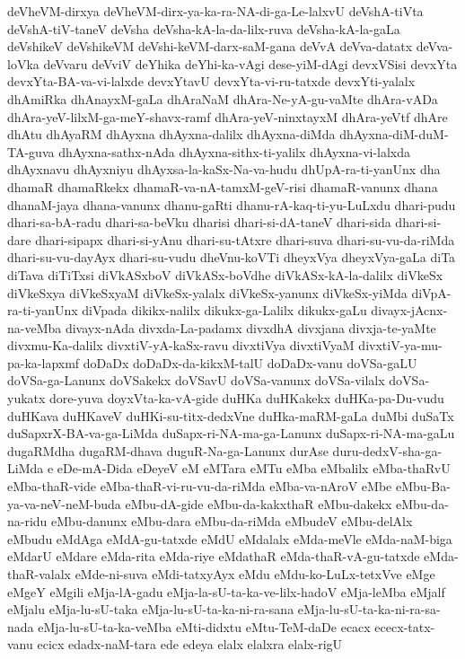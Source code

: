{deVheVM-dirxya
deVheVM-dirx-ya-ka-ra-NA-di-ga-Le-lalxvU
deVshA-tiVta
deVshA-tiV-taneV
deVsha
deVsha-kA-la-da-lilx-ruva
deVsha-kA-la-gaLa
deVshikeV
deVshikeVM
deVshi-keVM-darx-saM-gana
deVvA
deVva-datatx
deVva-loVka
deVvaru
deVviV
deYhika
deYhi-ka-vAgi
dese-yiM-dAgi
devxVSisi
devxYta
devxYta-BA-va-vi-lalxde
devxYtavU
devxYta-vi-ru-tatxde
devxYti-yalalx
dhAmiRka
dhAnayxM-gaLa
dhAraNaM
dhAra-Ne-yA-gu-vaMte
dhAra-vADa
dhAra-yeV-lilxM-ga-meY-shavx-ramf
dhAra-yeV-ninxtayxM
dhAra-yeVtf
dhAre
dhAtu
dhAyaRM
dhAyxna
dhAyxna-dalilx
dhAyxna-diMda
dhAyxna-diM-duM-TA-guva
dhAyxna-sathx-nAda
dhAyxna-sithx-ti-yalilx
dhAyxna-vi-lalxda
dhAyxnavu
dhAyxniyu
dhAyxsa-la-kaSx-Na-va-hudu
dhUpA-ra-ti-yanUnx
dha
dhamaR
dhamaRkekx
dhamaR-va-nA-tamxM-geV-risi
dhamaR-vanunx
dhana
dhanaM-jaya
dhana-vanunx
dhanu-gaRti
dhanu-rA-kaq-ti-yu-LuLxdu
dhari-pudu
dhari-sa-bA-radu
dhari-sa-beVku
dharisi
dhari-si-dA-taneV
dhari-sida
dhari-si-dare
dhari-sipapx
dhari-si-yAnu
dhari-su-tAtxre
dhari-suva
dhari-su-vu-da-riMda
dhari-su-vu-dayAyx
dhari-su-vudu
dheVnu-koVTi
dheyxVya
dheyxVya-gaLa
diTa
diTava
diTiTxsi
diVkASxboV
diVkASx-boVdhe
diVkASx-kA-la-dalilx
diVkeSx
diVkeSxya
diVkeSxyaM
diVkeSx-yalalx
diVkeSx-yanunx
diVkeSx-yiMda
diVpA-ra-ti-yanUnx
diVpada
dikikx-nalilx
dikukx-ga-Lalilx
dikukx-gaLu
divayx-jAcnx-na-veMba
divayx-nAda
divxda-La-padamx
divxdhA
divxjana
divxja-te-yaMte
divxmu-Ka-dalilx
divxtiV-yA-kaSx-ravu
divxtiVya
divxtiVyaM
divxtiV-ya-mu-pa-ka-lapxmf
doDaDx
doDaDx-da-kikxM-talU
doDaDx-vanu
doVSa-gaLU
doVSa-ga-Lanunx
doVSakekx
doVSavU
doVSa-vanunx
doVSa-vilalx
doVSa-yukatx
dore-yuva
doyxVta-ka-vA-gide
duHKa
duHKakekx
duHKa-pa-Du-vudu
duHKava
duHKaveV
duHKi-su-titx-dedxVne
duHka-maRM-gaLa
duMbi
duSaTx
duSapxrX-BA-va-ga-LiMda
duSapx-ri-NA-ma-ga-Lanunx
duSapx-ri-NA-ma-gaLu
dugaRMdha
dugaRM-dhava
duguR-Na-ga-Lanunx
durAse
duru-dedxV-sha-ga-LiMda
e
eDe-mA-Dida
eDeyeV
eM
eMTara
eMTu
eMba
eMbalilx
eMba-thaRvU
eMba-thaR-vide
eMba-thaR-vi-ru-vu-da-riMda
eMba-va-nAroV
eMbe
eMbu-Ba-ya-va-neV-neM-buda
eMbu-dA-gide
eMbu-da-kakxthaR
eMbu-dakekx
eMbu-da-na-ridu
eMbu-danunx
eMbu-dara
eMbu-da-riMda
eMbudeV
eMbu-delAlx
eMbudu
eMdAga
eMdA-gu-tatxde
eMdU
eMdalalx
eMda-meVle
eMda-naM-biga
eMdarU
eMdare
eMda-rita
eMda-riye
eMdathaR
eMda-thaR-vA-gu-tatxde
eMda-thaR-valalx
eMde-ni-suva
eMdi-tatxyAyx
eMdu
eMdu-ko-LuLx-tetxVve
eMge
eMgeY
eMgili
eMja-lA-gadu
eMja-la-sU-ta-ka-ve-lilx-hadoV
eMja-leMba
eMjalf
eMjalu
eMja-lu-sU-taka
eMja-lu-sU-ta-ka-ni-ra-sana
eMja-lu-sU-ta-ka-ni-ra-sa-nada
eMja-lu-sU-ta-ka-veMba
eMti-didxtu
eMtu-TeM-daDe
ecacx
ececx-tatx-vanu
ecicx
edadx-naM-tara
ede
edeya
elalx
elalxra
elalx-rigU
}
